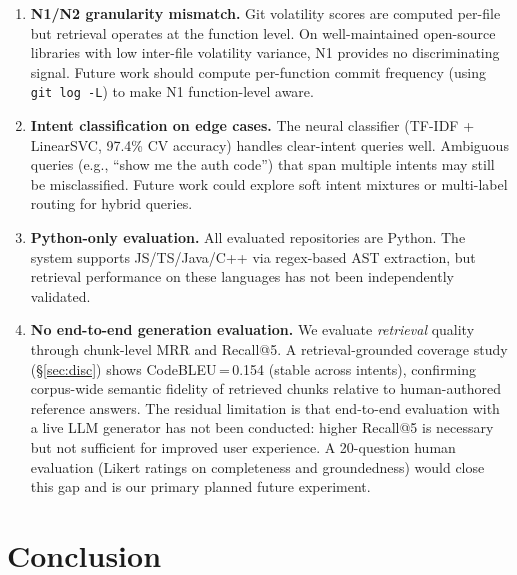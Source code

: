 \documentclass[runningheads]{llncs}
\begin{document}
\begin{enumerate}[leftmargin=*,label=(\arabic*)]
  \item \textbf{N1/N2 granularity mismatch.} Git volatility scores
        are computed per-file but retrieval operates at the function
        level. On well-maintained open-source libraries with low
        inter-file volatility variance, N1 provides no discriminating
        signal. Future work should compute per-function commit
        frequency (using \texttt{git log -L}) to make N1
        function-level aware.

  \item \textbf{Intent classification on edge cases.} The neural
        classifier (TF-IDF + LinearSVC, 97.4\% CV accuracy) handles
        clear-intent queries well. Ambiguous queries
        (e.g., ``show me the auth code'') that span multiple intents
        may still be misclassified. Future work could explore
        soft intent mixtures or multi-label routing for hybrid queries.

  \item \textbf{Python-only evaluation.} All evaluated repositories
        are Python. The system supports JS/TS/Java/C++ via
        regex-based AST extraction, but retrieval performance on
        these languages has not been independently validated.

  \item \textbf{No end-to-end generation evaluation.}
        We evaluate \emph{retrieval} quality through chunk-level MRR and
        Recall@5. A retrieval-grounded coverage study (\S\ref{sec:disc})
        shows CodeBLEU\,=\,0.154 (stable across intents), confirming
        corpus-wide semantic fidelity of retrieved chunks relative to
        human-authored reference answers. The residual limitation is
        that end-to-end evaluation with a live LLM generator has not
        been conducted: higher Recall@5 is necessary but not sufficient
        for improved user experience. A 20-question human evaluation
        (Likert ratings on completeness and groundedness) would close
        this gap and is our primary planned future experiment.
\end{enumerate}

\section{Conclusion}
\label{sec:conc}
\end{document}
